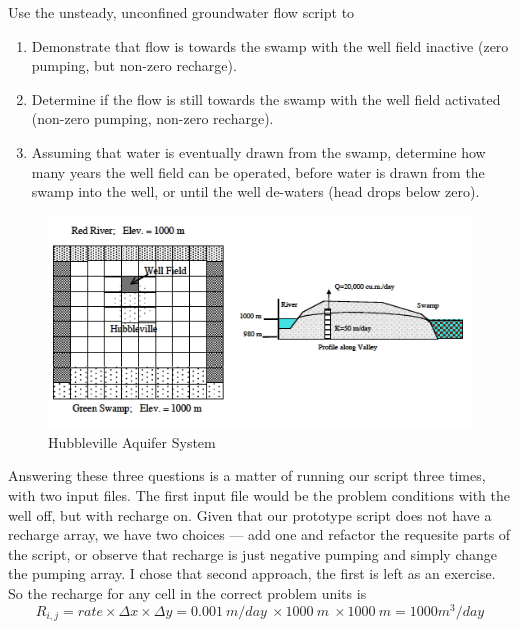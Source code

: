 Use the unsteady, unconfined groundwater flow script to
\begin{enumerate}
\item Demonstrate that flow is towards the swamp with the well field inactive (zero pumping, but non-zero recharge).
\item Determine if the flow is still towards the swamp with the well field activated (non-zero pumping, non-zero recharge).
\item Assuming that water is eventually drawn from the swamp, determine how many years the well field can be operated, before water is drawn from the swamp into the well, or until the well de-waters (head drops below zero).
\end{enumerate}

\begin{figure}[h!] %
   \centering
   \includegraphics[width=6in]{./18-UnsteadyGroundwaterFlow/Hubbleville2.jpg} 
   \caption{Hubbleville Aquifer System}
   \label{fig:Hubbleville3}
\end{figure}

Answering these three questions is a matter of running our script three times, with two input files. 
The first input file would be the problem conditions with the well off, but with recharge on.
Given that our prototype script does not have a recharge array, we have two choices --- add one and refactor the requesite parts of the script, or observe that recharge is just negative pumping and simply change the pumping array.  
I chose that second approach, the first is left as an exercise.
So the recharge for any cell in the correct problem units is 
\begin{equation}
R_{i,j} = rate \times \Delta x \times \Delta y = 0.001~m/day~\times 1000~m~\times 1000~m = 1000 m^3/day
\end{equation}

